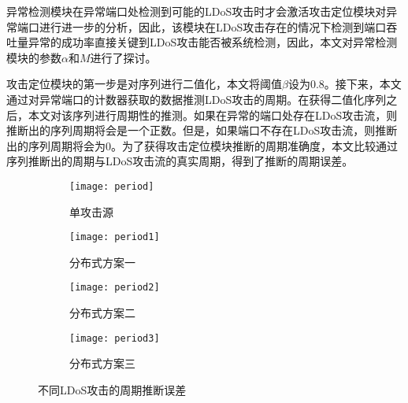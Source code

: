 异常检测模块在异常端口处检测到可能的LDoS攻击时才会激活攻击定位模块对异常端口进行进一步的分析，因此，该模块在LDoS攻击存在的情况下检测到端口吞吐量异常的成功率直接关键到LDoS攻击能否被系统检测，因此，本文对异常检测模块的参数$\alpha$和$M$进行了探讨。







攻击定位模块的第一步是对序列进行二值化，本文将阈值$\beta$设为0.8。接下来，本文通过对异常端口的计数器获取的数据推测LDoS攻击的周期。在获得二值化序列之后，本文对该序列进行周期性的推测。如果在异常的端口处存在LDoS攻击流，则推断出的序列周期将会是一个正数。但是，如果端口不存在LDoS攻击流，则推断出的序列周期将会为0。为了获得攻击定位模块推断的周期准确度，本文比较通过序列推断出的周期与LDoS攻击流的真实周期，得到了推断的周期误差。

\begin{figure}
    \begin{subfigure}{.49\textwidth}
        \centering
        \texttt{[image: period]}
        \caption{单攻击源}
        \label{fig:period-single}
    \end{subfigure}
    \begin{subfigure}{.49\textwidth}
        \centering
        \texttt{[image: period1]}
        \caption{分布式方案一}
        \label{fig:period-2h-mod1}
    \end{subfigure}

    \begin{subfigure}{.49\textwidth}
        \centering
        \texttt{[image: period2]}
        \caption{分布式方案二}
        \label{fig:period-2h-mod2}
    \end{subfigure}
    \begin{subfigure}{.49\textwidth}
        \centering
        \texttt{[image: period3]}
        \caption{分布式方案三}
        \label{fig:period-2h-mod3}
    \end{subfigure}


    \caption{不同LDoS攻击的周期推断误差}
    \label{fig:period-all}
\end{figure}


